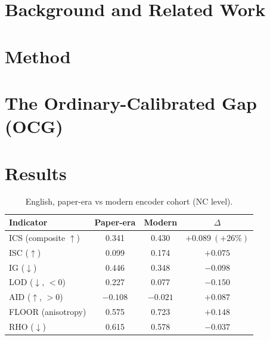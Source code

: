 \documentclass[twoside]{romjist}
\begin{document}
\section{Background and Related Work}

\section{Method}

\section{The Ordinary-Calibrated Gap (OCG)}

\section{Results}

\begin{table}[t]
\centering
\caption{English, paper-era vs modern encoder cohort (NC level).}
\begin{tabular}{lccc}
\toprule
Indicator & Paper-era & Modern & $\Delta$ \\
\midrule
ICS (composite $\uparrow$) & 0.341 & 0.430 & $+0.089\ (+26\%)$ \\
ISC ($\uparrow$)           & 0.099 & 0.174 & $+0.075$ \\
IG ($\downarrow$)          & 0.446 & 0.348 & $-0.098$ \\
LOD ($\downarrow$, $<0$)   & 0.227 & 0.077 & $-0.150$ \\
AID ($\uparrow$, $>0$)     & $-0.108$ & $-0.021$ & $+0.087$ \\
FLOOR (anisotropy)         & 0.575 & 0.723 & $+0.148$ \\
RHO ($\downarrow$)         & 0.615 & 0.578 & $-0.037$ \\
\bottomrule
\end{tabular}
\end{table}
\end{document}

